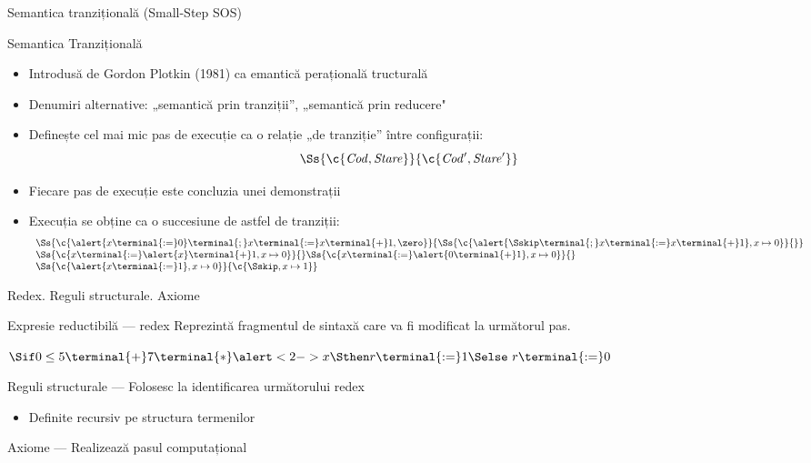 \documentclass[xcolor=pdftex,romanian,colorlinks]{beamer}
\begin{document}
\begin{section}{Semantica tranzițională (Small-Step SOS)}
  \begin{frame}{Semantica Tranzițională}
  \begin{itemize}
  \item Introdusă de Gordon Plotkin (1981) ca emantică perațională tructurală
  \item Denumiri alternative: „semantică prin tranziții”, „semantică prin reducere"
  \item Definește cel mai mic pas de execuție ca o relație „de tranziție” între configurații:
  $$\Ss{\c{{\it Cod}, {\it Stare}}}{\c{{\it Cod'}, {\it Stare'}}}$$
  \item Fiecare pas de execuție este concluzia unei demonstrații
  \item Execuția se obține ca o succesiune de astfel de tranziții:
  $$\begin{array}{l}\Ss{\c{\alert{x \terminal{:=} 0} \terminal{;}  x \terminal{:=} x \terminal{+} 1 ,\zero}}{\Ss{\c{\alert{\Sskip \terminal{;}x \terminal{:=} x \terminal{+} 1} ,x \mapsto 0}}{}}
\\
  {\Ss{\c{x \terminal{:=} \alert{x} \terminal{+} 1 ,x \mapsto 0}}{}}
  {\Ss{\c{x \terminal{:=} \alert{0 \terminal{+} 1} ,x \mapsto 0}}{}}
  \\
  {\Ss{\c{\alert{x \terminal{:=} 1 },x \mapsto 0}}{{\c{\Sskip,x \mapsto 1}}}}
  \end{array}$$
  \end{itemize}
  \end{frame}

  \begin{frame}{Redex. Reguli structurale. Axiome}
  \begin{block}{\alert{Ex}presie \alert{red}uctibilă --- \alert{redex}}
  Reprezintă fragmentul de sintaxă care va fi modificat la următorul pas.

  \hfill$\Sif 0 \leq 5 \terminal{+} 7 \terminal{*} \alert<2->{x} \Sthen r \terminal{:=}1 \Selse\ r \terminal{:=}0 $\hfill\
  \end{block}

  \begin{block}{Reguli structurale --- Folosesc la identificarea următorului redex}
  \begin{itemize}
  \item Definite recursiv pe structura termenilor
  \end{itemize}
  \end{block}
  \begin{block}{Axiome --- Realizează pasul computațional}
  \onslide<4>{$$\reg{\Ss{\c{\Sif {\terminal{true}}\Sthen {\it bl}_1 \Selse {\it bl}_2,\sigma}}{\c{{\it bl}_1,\sigma}}}{}{}$$}
  \end{block}
  \end{frame}
  \end{section}
\end{document}
